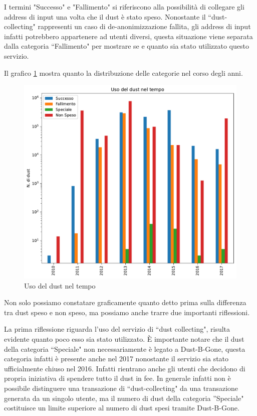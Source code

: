 I termini "Successo" e "Fallimento" si riferiscono alla possibilità di collegare gli address di input una volta che il dust è stato speso. Nonostante il ``dust-collecting" rappresenti un caso di de-anonimizzazione fallita, gli address di input infatti potrebbero appartenere ad utenti diversi, questa situazione viene separata dalla categoria ``Fallimento" per mostrare se e quanto sia stato utilizzato questo servizio.

Il grafico \ref{fig:dust_year} mostra quanto la distribuzione delle categorie nel corso degli anni.
\begin{figure}[h!]
    \centering
    \includegraphics[scale=0.6]{Grafici/uso_del_dust_new.pdf}
    \caption{Uso del dust nel tempo}
    \label{fig:dust_year}
\end{figure}
\FloatBarrier

Non solo possiamo constatare graficamente quanto detto prima sulla differenza tra dust speso e non speso, ma possiamo anche trarre due importanti riflessioni. 

La prima riflessione riguarda l'uso del servizio di ``dust collecting", risulta evidente quanto poco esso sia stato utilizzato. È importante notare che il dust della categoria ``Speciale" non necessariamente è legato a Dust-B-Gone, questa categoria infatti è presente anche nel 2017 nonostante il servizio sia stato ufficialmente chiuso nel 2016. Infatti rientrano anche gli utenti che decidono di propria iniziativa di spendere tutto il dust in fee. In generale infatti non è possibile distinguere una transazione di ``dust-collecting" da una transazione generata da un singolo utente, ma il numero di dust della categoria ''Speciale" costituisce un limite superiore al numero di dust spesi tramite Dust-B-Gone.

